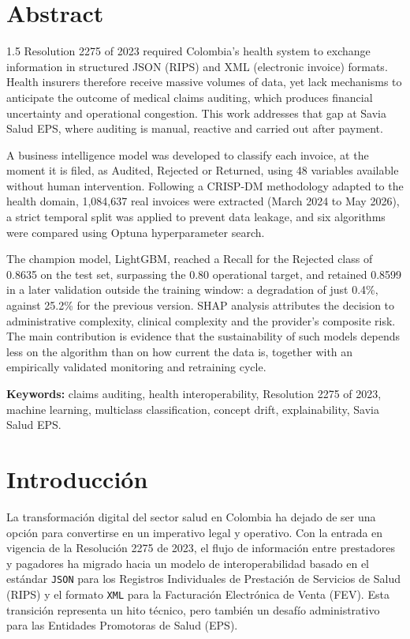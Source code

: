 \documentclass[12pt,letterpaper]{report}
\begin{document}
\chapter*{Abstract}
\begin{spacing}{1.5}
Resolution 2275 of 2023 required Colombia's health system to exchange
information in structured JSON (RIPS) and XML (electronic invoice) formats.
Health insurers therefore receive massive volumes of data, yet lack mechanisms
to anticipate the outcome of medical claims auditing, which produces financial
uncertainty and operational congestion. This work addresses that gap at Savia
Salud EPS, where auditing is manual, reactive and carried out after payment.

A business intelligence model was developed to classify each invoice, at the
moment it is filed, as Audited, Rejected or Returned, using 48 variables
available without human intervention. Following a CRISP-DM methodology adapted
to the health domain, 1,084,637 real invoices were extracted (March 2024 to
May 2026), a strict temporal split was applied to prevent data leakage, and six
algorithms were compared using Optuna hyperparameter search.

The champion model, LightGBM, reached a Recall for the Rejected class of 0.8635
on the test set, surpassing the 0.80 operational target, and retained 0.8599 in
a later validation outside the training window: a degradation of just 0.4\%,
against 25.2\% for the previous version. SHAP analysis attributes the decision
to administrative complexity, clinical complexity and the provider's composite
risk. The main contribution is evidence that the sustainability of such models
depends less on the algorithm than on how current the data is, together with an
empirically validated monitoring and retraining cycle.

\textbf{Keywords:} claims auditing, health interoperability, Resolution 2275 of
2023, machine learning, multiclass classification, concept drift,
explainability, Savia Salud EPS.
\end{spacing}

\clearpage
\chapter{Introducción}
La transformación digital del sector salud en Colombia ha dejado de ser una opción para convertirse en un imperativo legal y operativo. Con la entrada en vigencia de la Resolución 2275 de 2023, el flujo de información entre prestadores y pagadores ha migrado hacia un modelo de interoperabilidad basado en el estándar \texttt{JSON} para los Registros Individuales de Prestación de Servicios de Salud (RIPS) y el formato \texttt{XML} para la Facturación Electrónica de Venta (FEV). Esta transición representa un hito técnico, pero también un desafío administrativo para las Entidades Promotoras de Salud (EPS).
\end{document}

